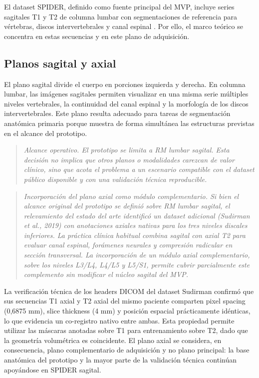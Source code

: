 El dataset SPIDER, definido como fuente principal del MVP, incluye series sagitales T1 y T2 de columna lumbar con segmentaciones de referencia para vértebras, discos intervertebrales y canal espinal \parencite{vandergraaf_spider_2024}. Por ello, el marco teórico se concentra en estas secuencias y en este plano de adquisición.

\subsection{Planos sagital y axial}

El plano sagital divide el cuerpo en porciones izquierda y derecha. En columna lumbar, las imágenes sagitales permiten visualizar en una misma serie múltiples niveles vertebrales, la continuidad del canal espinal y la morfología de los discos intervertebrales. Este plano resulta adecuado para tareas de segmentación anatómica primaria porque muestra de forma simultánea las estructuras previstas en el alcance del prototipo.

\begin{quote}
\itshape
Alcance operativo. El prototipo se limita a RM lumbar sagital. Esta decisión no implica que otros planos o modalidades carezcan de valor clínico, sino que acota el problema a un escenario compatible con el dataset público disponible y con una validación técnica reproducible.
\end{quote}


\begin{quote}
\itshape
Incorporación del plano axial como módulo complementario. Si bien el alcance original del prototipo se definió sobre RM lumbar sagital, el relevamiento del estado del arte identificó un dataset adicional (Sudirman et al., 2019) con anotaciones axiales nativas para los tres niveles discales inferiores. La práctica clínica habitual combina sagital con axial T2 para evaluar canal espinal, forámenes neurales y compresión radicular en sección transversal. La incorporación de un módulo axial complementario, sobre los niveles L3/L4, L4/L5 y L5/S1, permite cubrir parcialmente este complemento sin modificar el núcleo sagital del MVP.
\end{quote}

La verificación técnica de los headers DICOM del dataset Sudirman confirmó que sus secuencias T1 axial y T2 axial del mismo paciente comparten pixel spacing (0,6875 mm), slice thickness (4 mm) y posición espacial prácticamente idénticas, lo que evidencia un co-registro nativo entre ambas. Esta propiedad permite utilizar las máscaras anotadas sobre T1 para entrenamiento sobre T2, dado que la geometría volumétrica es coincidente. El plano axial se considera, en consecuencia, plano complementario de adquisición y no plano principal: la base anatómica del prototipo y la mayor parte de la validación técnica continúan apoyándose en SPIDER sagital.

